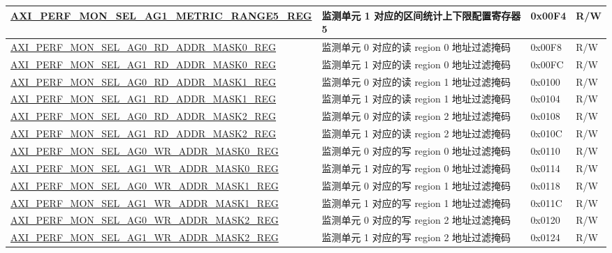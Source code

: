 \begin{longtable}{ | p{9.1cm} | p{5cm} | p{1.3cm} | p{1.3cm} | }
\hyperref[regdesc:AXIPERFMONSELAGNMETRICRANGEMREG]{AXI\_PERF\_MON\_SEL\_AG1\_METRIC\_RANGE5\_REG} & 监测单元 1 对应的区间统计上下限配置寄存器 5 & 0x00F4 & R/W\\ \hline
\hyperref[regdesc:AXIPERFMONSELAGNRDADDRMASKMREG]{AXI\_PERF\_MON\_SEL\_AG0\_RD\_ADDR\_MASK0\_REG} & 监测单元 0 对应的读 region 0 地址过滤掩码 & 0x00F8 & R/W\\ \hline
\hyperref[regdesc:AXIPERFMONSELAGNRDADDRMASKMREG]{AXI\_PERF\_MON\_SEL\_AG1\_RD\_ADDR\_MASK0\_REG} & 监测单元 1 对应的读 region 0 地址过滤掩码 & 0x00FC & R/W\\ \hline
\hyperref[regdesc:AXIPERFMONSELAGNRDADDRMASKMREG]{AXI\_PERF\_MON\_SEL\_AG0\_RD\_ADDR\_MASK1\_REG} & 监测单元 0 对应的读 region 1 地址过滤掩码 & 0x0100 & R/W\\ \hline
\hyperref[regdesc:AXIPERFMONSELAGNRDADDRMASKMREG]{AXI\_PERF\_MON\_SEL\_AG1\_RD\_ADDR\_MASK1\_REG} & 监测单元 1 对应的读 region 1 地址过滤掩码 & 0x0104 & R/W\\ \hline
\hyperref[regdesc:AXIPERFMONSELAGNRDADDRMASKMREG]{AXI\_PERF\_MON\_SEL\_AG0\_RD\_ADDR\_MASK2\_REG} & 监测单元 0 对应的读 region 2 地址过滤掩码 & 0x0108 & R/W\\ \hline
\hyperref[regdesc:AXIPERFMONSELAGNRDADDRMASKMREG]{AXI\_PERF\_MON\_SEL\_AG1\_RD\_ADDR\_MASK2\_REG} & 监测单元 1 对应的读 region 2 地址过滤掩码 & 0x010C & R/W\\ \hline
\hyperref[regdesc:AXIPERFMONSELAGNWRADDRMASKMREG]{AXI\_PERF\_MON\_SEL\_AG0\_WR\_ADDR\_MASK0\_REG} & 监测单元 0 对应的写 region 0 地址过滤掩码 & 0x0110 & R/W\\ \hline
\hyperref[regdesc:AXIPERFMONSELAGNWRADDRMASKMREG]{AXI\_PERF\_MON\_SEL\_AG1\_WR\_ADDR\_MASK0\_REG} & 监测单元 1 对应的写 region 0 地址过滤掩码 & 0x0114 & R/W\\ \hline
\hyperref[regdesc:AXIPERFMONSELAGNWRADDRMASKMREG]{AXI\_PERF\_MON\_SEL\_AG0\_WR\_ADDR\_MASK1\_REG} & 监测单元 0 对应的写 region 1 地址过滤掩码 & 0x0118 & R/W\\ \hline
\hyperref[regdesc:AXIPERFMONSELAGNWRADDRMASKMREG]{AXI\_PERF\_MON\_SEL\_AG1\_WR\_ADDR\_MASK1\_REG} & 监测单元 1 对应的写 region 1 地址过滤掩码 & 0x011C & R/W\\ \hline
\hyperref[regdesc:AXIPERFMONSELAGNWRADDRMASKMREG]{AXI\_PERF\_MON\_SEL\_AG0\_WR\_ADDR\_MASK2\_REG} & 监测单元 0 对应的写 region 2 地址过滤掩码 & 0x0120 & R/W\\ \hline
\hyperref[regdesc:AXIPERFMONSELAGNWRADDRMASKMREG]{AXI\_PERF\_MON\_SEL\_AG1\_WR\_ADDR\_MASK2\_REG} & 监测单元 1 对应的写 region 2 地址过滤掩码 & 0x0124 & R/W\\ \hline

\end{longtable}
